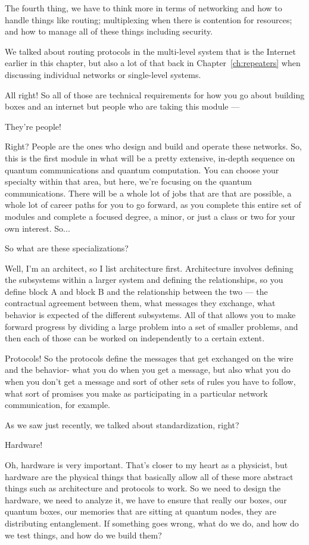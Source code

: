 \mmm The fourth thing, we have to think more in terms of networking and how to handle things like routing; multiplexing when there is contention for resources; and how to manage all of these things including security.

\rrr We talked about routing protocols in the multi-level system that is the Internet earlier in this chapter, but also a lot of that back in Chapter~\ref{ch:repeaters} when discussing individual networks or single-level systems.

All right! So all of those are technical requirements for how you go about building boxes and an internet but people who are taking this module ---

\mmm They're people! 

\rrr Right? People are the ones who design and build and operate these networks. So, this is the first module in what will be a pretty extensive, in-depth sequence on quantum communications and quantum computation. You can choose your specialty within that area, but here, we're focusing on the quantum communications. There will be a whole lot of jobs that are that are possible, a whole lot of career paths for you to go forward, as you complete this entire set of modules and complete a focused degree, a minor, or just a class or two for your own interest. So...

\mmm So what are these specializations?

\rrr Well, I'm an architect, so I list architecture first. Architecture involves defining the subsystems within a larger system and defining the relationships, so you define block A and block B and the relationship between the two --- the contractual agreement between them, what messages they exchange, what behavior is expected of the different subsystems. All of that allows you to make forward progress by dividing a large problem into a set of smaller problems, and then each of those can be worked on independently to a certain extent.

Protocols! So the protocols define the messages that get exchanged on the wire and the behavior- what you do when you get a message, but also what you do when you don't get a message and sort of other sets of rules you have to follow, what sort of promises you make as participating in a particular network communication, for example.

As we saw just recently, we talked about standardization, right?

Hardware!

\mmm Oh, hardware is very important. That's closer to my heart as a physicist, but hardware are the physical things that basically allow all of these more abstract things such as architecture and protocols to work. So we need to design the hardware, we need to analyze it, we have to ensure that really our boxes, our quantum boxes, our memories that are sitting at quantum nodes, they are distributing entanglement. If something goes wrong, what do we do, and how do we test things, and how do we build them?

